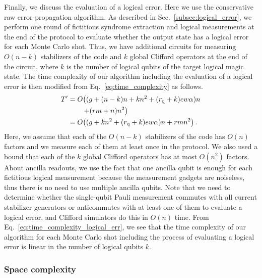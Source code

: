 \documentclass[
 reprint,
 amsmath,amssymb,
 pra,superscriptaddress, nofootinbib
]{revtex4-2}
\theoremstyle{definition}
\theoremstyle{plain}
\begin{document}
Finally, we discuss the evaluation of a logical error. Here we use the conservative raw error-propagation algorithm. As described in Sec.~\ref{subsec:logical_error}, we perform one round of fictitious syndrome extraction and logical measurements at the end of the protocol to evaluate whether the output state has a logical error for each Monte Carlo shot.
Thus, we have additional circuits for measuring $O(n-k)$ stabilizers of the code and $k$ global Clifford operators at the end of the circuit, where $k$ is the number of logical qubits of the target logical magic state.
The time complexity of our algorithm including the evaluation of a logical error is then modified from Eq.~\eqref{eq:time_complexity} as follows.
\begin{align}
  T'
  &=O\!\left(
      (g+(n-k)n+kn^2+(r_\mathrm{q}+k)ew\alpha)n
      \right. \notag\\
  &\qquad\left.
      +(rm+n)n^2
      \right)\\
  &=O\!\left((g+kn^2+(r_\mathrm{q}+k)ew\alpha)n
      +rmn^2\right).
  \label{eq:time_complexity_logical_err}
\end{align}
Here, we assume that each of the $O(n-k)$ stabilizers of the code has $O(n)$ factors and we measure each of them at least once in the protocol. We also used a bound that each of the $k$ global Clifford operators has at most $O(n^2)$ factors.
About ancilla readouts, we use the fact that one ancilla qubit is enough for each fictitious logical measurement because the measurement gadgets are noiseless, thus there is no need to use multiple ancilla qubits.
Note that we need to determine whether the single-qubit Pauli measurement commutes with all current stabilizer generators or anticommutes with at least one of them to evaluate a logical error, and Clifford simulators do this in $O(n)$ time.
From Eq.~\eqref{eq:time_complexity_logical_err}, we see that the time complexity of our algorithm for each Monte Carlo shot including the process of evaluating a logical error is linear in the number of logical qubits $k$.

\subsubsection{Space complexity}
\label{subsubsec:space}
\end{document}
